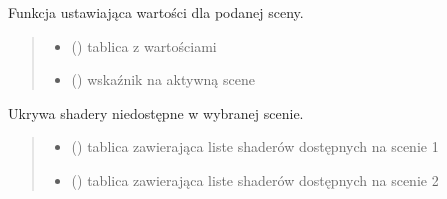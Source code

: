 \documentclass[a4paper,10pt,openany,english]{sphinxmanual}
\begin{document}

\begin{fulllineitems}
\label{\detokenize{js/js-functions:setSceneValues}}
\pysigstartsignatures
\pysiglinewithargsret
{}
{\sphinxparamcomma {}}
{}
\pysigstopsignatures
\sphinxAtStartPar
Funkcja ustawiająca wartości dla podanej sceny.
\begin{quote}\begin{description}
\begin{itemize}
\item {} 
\sphinxAtStartPar
{} () \textendash{} tablica z wartościami

\item {} 
\sphinxAtStartPar
{} () \textendash{} wskaźnik na aktywną scene

\end{itemize}

\end{description}\end{quote}

\end{fulllineitems}


\begin{fulllineitems}
\label{\detokenize{js/js-functions:updateSceneShaders}}
\pysigstartsignatures
\pysiglinewithargsret
{}
{\sphinxparamcomma {}}
{}
\pysigstopsignatures
\sphinxAtStartPar
Ukrywa shadery niedostępne w wybranej scenie.
\begin{quote}\begin{description}
\begin{itemize}
\item {} 
\sphinxAtStartPar
{} () \textendash{} tablica zawierająca liste shaderów dostępnych na scenie 1

\item {} 
\sphinxAtStartPar
{} () \textendash{} tablica zawierająca liste shaderów dostępnych na scenie 2

\end{itemize}

\end{description}\end{quote}

\end{fulllineitems}
\end{document}
